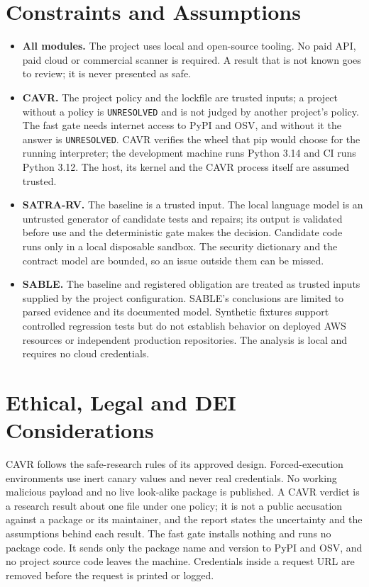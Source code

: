 \section{Constraints and Assumptions}
\begin{sloppypar}
\begin{itemize}
    \item \textbf{All modules.} The project uses local and open-source tooling. No paid API, paid cloud or commercial scanner is required. A result that is not known goes to review; it is never presented as safe.
    \item \textbf{CAVR.} The project policy and the lockfile are trusted inputs; a project without a policy is \texttt{UNRESOLVED} and is not judged by another project's policy. The fast gate needs internet access to PyPI and OSV, and without it the answer is \texttt{UNRESOLVED}. CAVR verifies the wheel that pip would choose for the running interpreter; the development machine runs Python 3.14 and CI runs Python 3.12. The host, its kernel and the CAVR process itself are assumed trusted.
    \item \textbf{SATRA-RV.} The baseline is a trusted input. The local language model is an untrusted generator of candidate tests and repairs; its output is validated before use and the deterministic gate makes the decision. Candidate code runs only in a local disposable sandbox. The security dictionary and the contract model are bounded, so an issue outside them can be missed.
    \item \textbf{SABLE.} The baseline and registered obligation are treated as trusted inputs supplied by the project configuration. SABLE's conclusions are limited to parsed evidence and its documented model. Synthetic fixtures support controlled regression tests but do not establish behavior on deployed AWS resources or independent production repositories. The analysis is local and requires no cloud credentials.
\end{itemize}
\end{sloppypar}

\section{Ethical, Legal and DEI Considerations}
\begin{sloppypar}
CAVR follows the safe-research rules of its approved design. Forced-execution environments use inert canary values and never real credentials. No working malicious payload and no live look-alike package is published. A CAVR verdict is a research result about one file under one policy; it is not a public accusation against a package or its maintainer, and the report states the uncertainty and the assumptions behind each result. The fast gate installs nothing and runs no package code. It sends only the package name and version to PyPI and OSV, and no project source code leaves the machine. Credentials inside a request URL are removed before the request is printed or logged.
\end{sloppypar}

